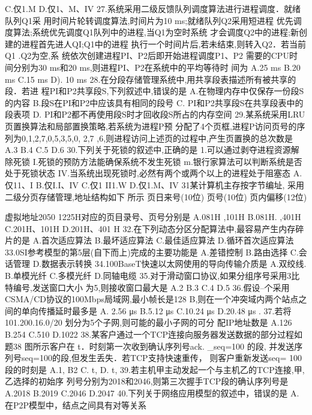C.仅1.M
D.仅1、M、IV
27.系统采用二级反馈队列调度算法进行进程调度．就绪队列Q1采
用时间片轮转调度算法,时间片为10 ms;就绪队列Q2采用短进程
优先调度算法;系统优先调度Q1队列中的进程,当Q1为空时系统
才会调度Q2中的进程;新创建的进程首先进人QI;Q1中的进程
执行一个时间片后,若未结束,则转入Q2．若当前Q1 .Q2为空,系
统依次创建进程PI、P2后即开始进程调度P1、P2 需要的CPU时
间分别为30 ms和20 ms,则进程PI、P2在系统中的平均等待时
间为
A.25 ms
B.20 ms
C.15 ms
D). 10 ms
28.在分段存储管理系统中,用共享段表描述所有被共享的段．若进
程PI和P2共享段S,下列叙述中,错误的是
A.在物理内存中仅保存一份段S的内容
B.段S在PI和P2中应该具有相同的段号
C. PI和P2共享段S在共享段表中的段表项
D. PI和P2都不再使用段S时才回收段S所占的内存空间
29.某系统采用LRU页置换算法和局部置换策略,若系统为进程P预
分配了4个页框,进程P访问页号的序列为0,1,2,7,0,5,3,5,0,
2,7 ,6,则进程访问上述页的过程中,产生页置换的总次数是
A.3
B.4
C.5
D.6
30.下列关于死锁的叙述中,正确的是
1.可以通过剥夺进程资源解除死锁
I.死锁的预防方法能确保系统不发生死锁
m.银行家算法可以判断系统是否处于死锁状态
IV.当系统出现死锁时,必然有两个或两个以上的进程处于阻塞态
A.仅11、I
B.仅I.I、IV
C.仅1 II1.W
D.仅1.M、IV
31某计算机主存按字节编址, 采用二级分页存储管理,地址结构如下
所示
页日来号(10位)
页号(10位)
页内偏移(12位)

虚拟地址2050 1225H对应的页目录号、页号分别是
A.081H ,101H
B.081H. ,401H
C.201H、101H
D.201H、401 H
32.在下列动态分区分配算法中,最容易产生内存碎片的是
A.首次适应算法
B.最坏适应算法
C.最佳适应算法
D.循环首次适应算法
33.0SI参考模型的第5层(自下而上)完成的主要功能是
A.差错控制
B.路由选择
C.会话管理
D.数据表示转换
34.100BaseT快速以太网使用的导向传输介质是
A.双绞线.
B.单模光纤
C.多模光纤 D.同轴电缆
35.对于滑动窗口协议,如果分组序号采用3比特编号,发送窗口大小
为5,则接收窗口最大是
A.2
B.3
C.4
D.5
36.假设--个采用CSMA/CD协议的100Mbps局域网,最小帧长是128
B,则在一个冲突域内两个站点之间的单向传播延时最多是
A. 2.56 μs
B.5.12 μs
C.10.24 μs
D.20.48 μs .
37.若将101.200.16.0/20 划分为5个子网,则可能的最小子网的可分
配IP地址数是
A.126
B.254
C.510
D.1022
38.某客户通过一个TCP连接向服务器发送数据的部分过程如题38
图所示客户在 t．时刻第一次收到确认序列号ack. _seq=100 的段,
并发送序列号seq=100的段,但发生丢失．若TCP支持快速重传，
则客户重新发送seq= 100段的时刻是
A.1,
B2
C. t,
D. t,
39.若主机甲主动发起一个与主机乙的TCP连接,甲,乙选择的初始序
列号分别为2018和2046,则第三次握手TCP段的确认序列号是
A.2018
B.2019
C.2046
D.2047
40.下列关于网络应用模型的叙述中，错误的是
A.在P2P模型中，结点之间具有对等关系

